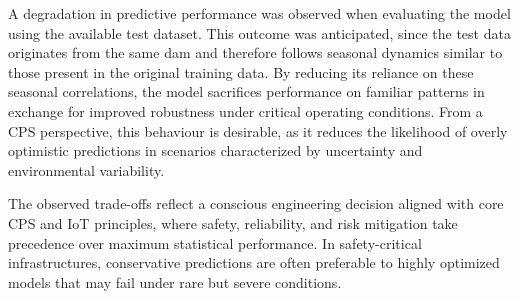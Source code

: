 A degradation in predictive performance was observed when evaluating the model using the available test dataset. This outcome was anticipated, since the test data originates from the same dam and therefore follows seasonal dynamics similar to those present in the original training data. By reducing its reliance on these seasonal correlations, the model sacrifices performance on familiar patterns in exchange for improved robustness under critical operating conditions. From a CPS perspective, this behaviour is desirable, as it reduces the likelihood of overly optimistic predictions in scenarios characterized by uncertainty and environmental variability.

The observed trade-offs reflect a conscious engineering decision aligned with core CPS and IoT principles, where safety, reliability, and risk mitigation take precedence over maximum statistical performance. In safety-critical infrastructures, conservative predictions are often preferable to highly optimized models that may fail under rare but severe conditions.

